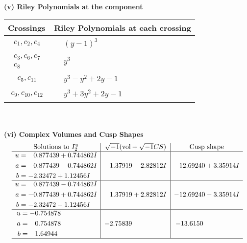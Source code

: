 \documentclass[1p]{elsarticle_modified}
\theoremstyle{definition}
\newcommand{\I}{\sqrt{-1}}
\begin{document}
\newpage\renewcommand{\arraystretch}{1}
\flushleft \textbf{(v) Riley Polynomials at the component}\newline \\
\begin{tabular}{m{50pt}|m{274pt}}
Crossings & \hspace{64pt}Riley Polynomials at each crossing \\
\hline $$\begin{aligned}c_{1},c_{2},c_{4}\end{aligned}$$&$\begin{aligned}
&(y-1)^3
\end{aligned}$\\
\hline $$\begin{aligned}c_{3},c_{6},c_{7}\\c_{8}\end{aligned}$$&$\begin{aligned}
&y^3
\end{aligned}$\\
\hline $$\begin{aligned}c_{5},c_{11}\end{aligned}$$&$\begin{aligned}
&y^3- y^2+2 y-1
\end{aligned}$\\
\hline $$\begin{aligned}c_{9},c_{10},c_{12}\end{aligned}$$&$\begin{aligned}
&y^3+3 y^2+2 y-1
\end{aligned}$\\
\hline
\end{tabular}\\~\\
\newpage\flushleft \textbf{(vi) Complex Volumes and Cusp Shapes}
$$\begin{array}{c|c|c}  
\text{Solutions to }I^u_{2}& \I (\text{vol} + \sqrt{-1}CS) & \text{Cusp shape}\\
 \hline 
\begin{aligned}
u &= \phantom{-}0.877439 + 0.744862 I \\
a &= -0.877439 - 0.744862 I \\
b &= -2.32472 + 1.12456 I\end{aligned}
 & \phantom{-}1.37919 - 2.82812 I & -12.69240 + 3.35914 I \\ \hline\begin{aligned}
u &= \phantom{-}0.877439 - 0.744862 I \\
a &= -0.877439 + 0.744862 I \\
b &= -2.32472 - 1.12456 I\end{aligned}
 & \phantom{-}1.37919 + 2.82812 I & -12.69240 - 3.35914 I \\ \hline\begin{aligned}
u &= -0.754878\phantom{ +0.000000I} \\
a &= \phantom{-}0.754878\phantom{ +0.000000I} \\
b &= \phantom{-}1.64944\phantom{ +0.000000I}\end{aligned}
 & -2.75839\phantom{ +0.000000I} & -13.6150\phantom{ +0.000000I}\\
 \hline 
 \end{array}$$\newpage
\end{document}
